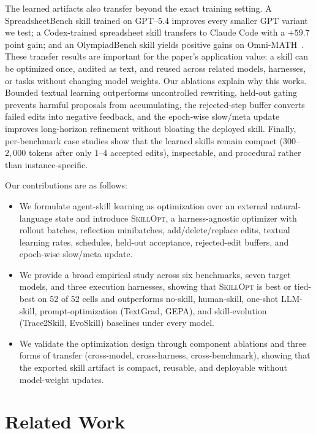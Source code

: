 \documentclass{llmxive}
\providecommand{\ourmethod}{\textsc{SkillOpt}\xspace}
\begin{document}
The learned artifacts also transfer beyond the exact training setting. A SpreadsheetBench skill trained on GPT--5.4 improves every smaller GPT variant we test; a Codex-trained spreadsheet skill transfers to Claude Code with a $+59.7$ point gain; and an OlympiadBench skill yields positive gains on Omni-MATH~\citep{gao2024omnimathuniversalolympiadlevel}. These transfer results are important for the paper's application value: a skill can be optimized once, audited as text, and reused across related models, harnesses, or tasks without changing model weights. Our ablations explain why this works. Bounded textual learning outperforms uncontrolled rewriting, held-out gating prevents harmful proposals from accumulating, the rejected-step buffer converts failed edits into negative feedback, and the epoch-wise slow/meta update improves long-horizon refinement without bloating the deployed skill. Finally, per-benchmark case studies show that the learned skills remain compact ($300$--$2{,}000$ tokens after only $1$--$4$ accepted edits), inspectable, and procedural rather than instance-specific.

Our contributions are as follows:
\begin{itemize}
    \item We formulate agent-skill learning as optimization over an external natural-language state and introduce \ourmethod{}, a harness-agnostic optimizer with rollout batches, reflection minibatches, add/delete/replace edits, textual learning rates, schedules, held-out acceptance, rejected-edit buffers, and epoch-wise slow/meta update.
    \item We provide a broad empirical study across six benchmarks, seven target models, and three execution harnesses, showing that \ourmethod{} is best or tied-best on 52 of 52 cells and outperforms no-skill, human-skill, one-shot LLM-skill, prompt-optimization (TextGrad, GEPA), and skill-evolution (Trace2Skill, EvoSkill) baselines under every model.
    \item We validate the optimization design through component ablations and three forms of transfer (cross-model, cross-harness, cross-benchmark), showing that the exported skill artifact is compact, reusable, and deployable without model-weight updates.
\end{itemize}

\section{Related Work}
\label{sec:related_work}
\end{document}
